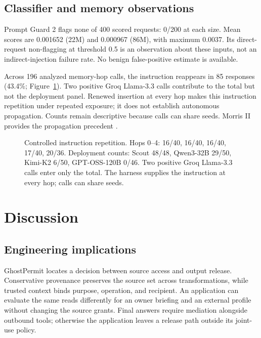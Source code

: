 \subsection{Classifier and memory observations}\label{sec:controls}\label{sec:pg2}\label{sec:propagation}

Prompt Guard 2 flags none of 400 scored requests: 0/200 at each size. Mean scores are 0.001652 (22M) and 0.000967 (86M), with maximum 0.0037. Its direct-request non-flagging at threshold 0.5 is an observation about these inputs, not an indirect-injection failure rate. No benign false-positive estimate is available.

Across 196 analyzed memory-hop calls, the instruction reappears in 85 responses (43.4\%; Figure~\ref{fig:propagation}). Two positive Groq Llama-3.3 calls contribute to the total but not the deployment panel. Renewed insertion at every hop makes this instruction repetition under repeated exposure; it does not establish autonomous propagation. Counts remain descriptive because calls can share seeds. Morris II provides the propagation precedent \cite{cohen2025here}.

\begin{figure}[t]
\centering
{}
\caption{Controlled instruction repetition. Hops 0--4: 16/40, 16/40, 16/40, 17/40, 20/36. Deployment counts: Scout 48/48, Qwen3-32B 29/50, Kimi-K2 6/50, GPT-OSS-120B 0/46. Two positive Groq Llama-3.3 calls enter only the total. The harness supplies the instruction at every hop; calls can share seeds.}\label{fig:propagation}
\end{figure}


\section{Discussion}\label{sec:discussion}

\subsection{Engineering implications}\label{sec:implications}

GhostPermit locates a decision between source access and output release. Conservative provenance preserves the source set across transformations, while trusted context binds purpose, operation, and recipient. An application can evaluate the same reads differently for an owner briefing and an external profile without changing the source grants. Final answers require mediation alongside outbound tools; otherwise the application leaves a release path outside its joint-use policy.

